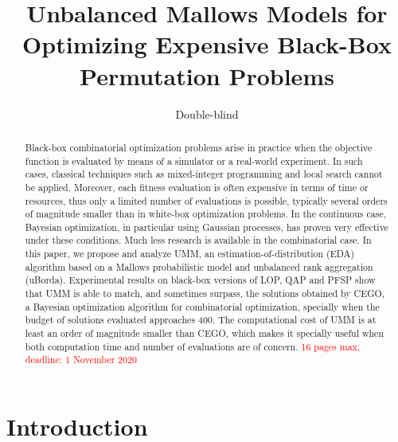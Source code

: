\documentclass[runningheads]{llncs}
\title{Unbalanced Mallows Models for Optimizing Expensive Black-Box Permutation Problems}
\author{Double-blind}
\date{}%
\begin{document}
\maketitle

\begin{abstract}
  Black-box combinatorial optimization problems arise in practice when the
  objective function is evaluated by means of a simulator or a real-world
  experiment. In such cases, classical techniques such as mixed-integer
  programming and local search cannot be applied. Moreover, each fitness
  evaluation is often expensive in terms of time or resources, thus only a
  limited number of evaluations is possible, typically several orders of
  magnitude smaller than in white-box optimization problems. In the continuous
  case, Bayesian optimization, in particular using Gaussian processes, has
  proven very effective under these conditions. Much less research is available
  in the combinatorial case. In this paper, we propose and analyze UMM, an
  estimation-of-distribution (EDA) algorithm based on a Mallows probabilistic
  model and unbalanced rank aggregation (uBorda). Experimental results on
  black-box versions of LOP, QAP and PFSP show that UMM is able to match, and
  sometimes surpass, the solutions obtained by CEGO, a Bayesian optimization
  algorithm for combinatorial optimization, specially when the budget of
  solutions evaluated approaches 400. The computational cost of UMM is at least
  an order of magnitude smaller than CEGO, which makes it specially useful when
  both computation time and number of evaluations are of concern.\sloppy
  \textcolor{red}{16 pages max, deadline: 1 November 2020}
\end{abstract}

\section{Introduction}
\end{document}
